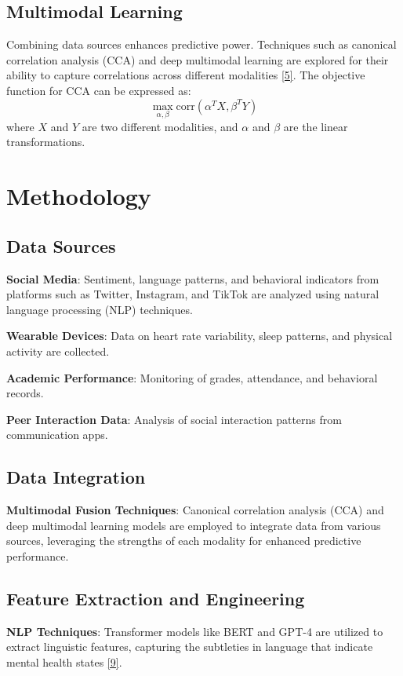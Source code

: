 \documentclass{article}
\begin{document}
\subsection{Multimodal Learning}
Combining data sources enhances predictive power. Techniques such as canonical correlation analysis (CCA) and deep multimodal learning are explored for their ability to capture correlations across different modalities \hyperref[ref:de]{[5]}. The objective function for CCA can be expressed as:
\begin{equation}
\max_{\alpha, \beta} \text{corr}(\alpha^T X, \beta^T Y)
\end{equation}
where $X$ and $Y$ are two different modalities, and $\alpha$ and $\beta$ are the linear transformations.

\section{Methodology}
\subsection{Data Sources}
\textbf{Social Media}: Sentiment, language patterns, and behavioral indicators from platforms such as Twitter, Instagram, and TikTok are analyzed using natural language processing (NLP) techniques.

\textbf{Wearable Devices}: Data on heart rate variability, sleep patterns, and physical activity are collected.

\textbf{Academic Performance}: Monitoring of grades, attendance, and behavioral records.

\textbf{Peer Interaction Data}: Analysis of social interaction patterns from communication apps.

\subsection{Data Integration}
\textbf{Multimodal Fusion Techniques}: Canonical correlation analysis (CCA) and deep multimodal learning models are employed to integrate data from various sources, leveraging the strengths of each modality for enhanced predictive performance.

\subsection{Feature Extraction and Engineering}
\textbf{NLP Techniques}: Transformer models like BERT and GPT-4 are utilized to extract linguistic features, capturing the subtleties in language that indicate mental health states \hyperref[ref:from]{[9]}.
\end{document}
